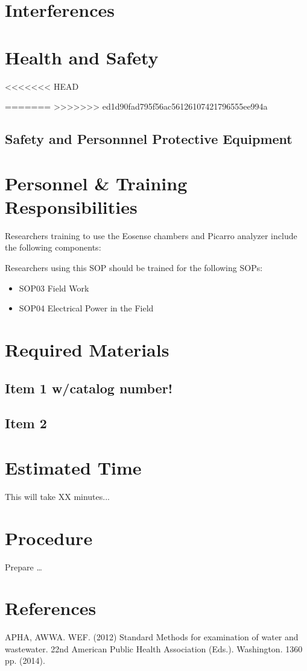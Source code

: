 \documentclass[12pt]{../SOP2}
\begin{document}
\section{Interferences}

\section{Health and Safety}

<<<<<<< HEAD
\NP \lipsum[2]

=======
>>>>>>> ed1d90fad795f56ac56126107421796555ee994a
\subsection{Safety and Personnnel Protective Equipment}


\section{Personnel \& Training Responsibilities}

Researchers training to use the Eosense chambers and Picarro analyzer include the following components: 



Researchers using this SOP should be trained for the following SOPs:

\begin{itemize}
  \item SOP03 Field Work
  \item SOP04 Electrical Power in the Field
\end{itemize}

\section{Required Materials}

\subsection{Item 1 w/catalog number!}
\subsection{Item 2}

\section{Estimated Time}

\NP This will take XX minutes...

\section{Procedure}

\NP Prepare \dots

\NP

\section{References}

\NP APHA, AWWA. WEF. (2012) Standard Methods for examination of water and wastewater. 22nd American Public Health Association (Eds.). Washington. 1360 pp. (2014).
\end{document}
